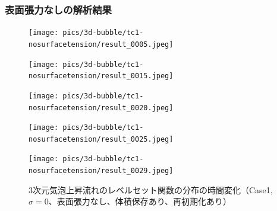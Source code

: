 \subsubsection{表面張力なしの解析結果}
\begin{figure}[H]
	\centering
	\begin{minipage}[b]{0.16\columnwidth}
	    \centering
	    \texttt{[image: pics/3d-bubble/tc1-nosurfacetension/result\_0005.jpeg]}
	\end{minipage}
	\begin{minipage}[b]{0.16\columnwidth}
	    \centering
	    \texttt{[image: pics/3d-bubble/tc1-nosurfacetension/result\_0015.jpeg]}
	\end{minipage}
	\begin{minipage}[b]{0.16\columnwidth}
	    \centering
	    \texttt{[image: pics/3d-bubble/tc1-nosurfacetension/result\_0020.jpeg]}
	\end{minipage}
	\begin{minipage}[b]{0.16\columnwidth}
	    \centering
	    \texttt{[image: pics/3d-bubble/tc1-nosurfacetension/result\_0025.jpeg]}
	\end{minipage}
	\begin{minipage}[b]{0.16\columnwidth}
	    \centering
	    \texttt{[image: pics/3d-bubble/tc1-nosurfacetension/result\_0029.jpeg]}
	\end{minipage}

	\caption{3次元気泡上昇流れのレベルセット関数の分布の時間変化（Case1, $\sigma=0$、表面張力なし、体積保存あり、再初期化あり）}
	\label{fig:3d-bubble_result_tc1}
\end{figure}

